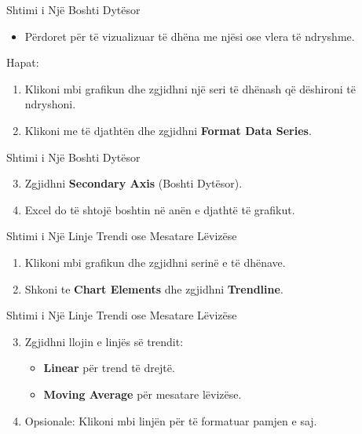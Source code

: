 \documentclass[
  ignorenonframetext,
]{beamer}
\providecommand{\tightlist}{%
  \setlength{\itemsep}{0pt}\setlength{\parskip}{0pt}}
\begin{document}
\begin{frame}{Shtimi i Një Boshti Dytësor}
\label{shtimi-i-njuxeb-boshti-dytuxebsor}
\begin{itemize}
\tightlist
\item
  Përdoret për të vizualizuar të dhëna me njësi ose vlera të ndryshme.
\end{itemize}

Hapat:

\begin{enumerate}
\item
  Klikoni mbi grafikun dhe zgjidhni një seri të dhënash që dëshironi të
  ndryshoni.
\item
  Klikoni me të djathtën dhe zgjidhni \textbf{Format Data Series}.
\end{enumerate}
\end{frame}

\begin{frame}{Shtimi i Një Boshti Dytësor}
\label{shtimi-i-njuxeb-boshti-dytuxebsor-1}
\begin{enumerate}
\setcounter{enumi}{2}
\item
  Zgjidhni \textbf{Secondary Axis} (Boshti Dytësor).
\item
  Excel do të shtojë boshtin në anën e djathtë të grafikut.
\end{enumerate}
\end{frame}

\begin{frame}{Shtimi i Një Linje Trendi ose Mesatare Lëvizëse}
\label{shtimi-i-njuxeb-linje-trendi-ose-mesatare-luxebvizuxebse}
\begin{enumerate}
\item
  Klikoni mbi grafikun dhe zgjidhni serinë e të dhënave.
\item
  Shkoni te \textbf{Chart Elements} dhe zgjidhni \textbf{Trendline}.
\end{enumerate}
\end{frame}

\begin{frame}{Shtimi i Një Linje Trendi ose Mesatare Lëvizëse}
\label{shtimi-i-njuxeb-linje-trendi-ose-mesatare-luxebvizuxebse-1}
\begin{enumerate}
\setcounter{enumi}{2}
\item
  Zgjidhni llojin e linjës së trendit:

  \begin{itemize}
  \item
    \textbf{Linear} për trend të drejtë.
  \item
    \textbf{Moving Average} për mesatare lëvizëse.
  \end{itemize}
\item
  Opsionale: Klikoni mbi linjën për të formatuar pamjen e saj.
\end{enumerate}
\end{frame}
\end{document}

